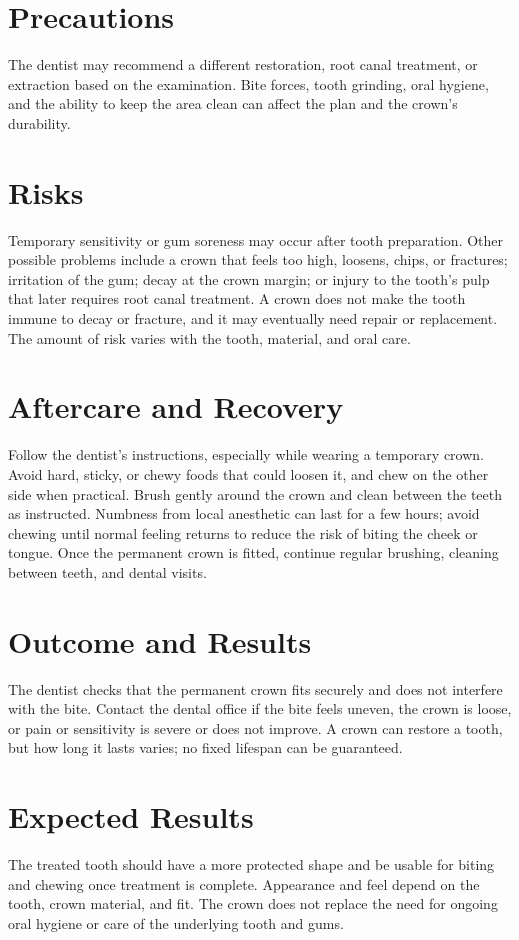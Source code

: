 \section*{Precautions}
The dentist may recommend a different restoration, root canal treatment, or extraction based on the examination. Bite forces, tooth grinding, oral hygiene, and the ability to keep the area clean can affect the plan and the crown's durability.

\section*{Risks}
Temporary sensitivity or gum soreness may occur after tooth preparation. Other possible problems include a crown that feels too high, loosens, chips, or fractures; irritation of the gum; decay at the crown margin; or injury to the tooth's pulp that later requires root canal treatment. A crown does not make the tooth immune to decay or fracture, and it may eventually need repair or replacement. The amount of risk varies with the tooth, material, and oral care.

\section*{Aftercare and Recovery}
Follow the dentist's instructions, especially while wearing a temporary crown. Avoid hard, sticky, or chewy foods that could loosen it, and chew on the other side when practical. Brush gently around the crown and clean between the teeth as instructed. Numbness from local anesthetic can last for a few hours; avoid chewing until normal feeling returns to reduce the risk of biting the cheek or tongue. Once the permanent crown is fitted, continue regular brushing, cleaning between teeth, and dental visits.

\section*{Outcome and Results}
The dentist checks that the permanent crown fits securely and does not interfere with the bite. Contact the dental office if the bite feels uneven, the crown is loose, or pain or sensitivity is severe or does not improve. A crown can restore a tooth, but how long it lasts varies; no fixed lifespan can be guaranteed.

\section*{Expected Results}
The treated tooth should have a more protected shape and be usable for biting and chewing once treatment is complete. Appearance and feel depend on the tooth, crown material, and fit. The crown does not replace the need for ongoing oral hygiene or care of the underlying tooth and gums.

